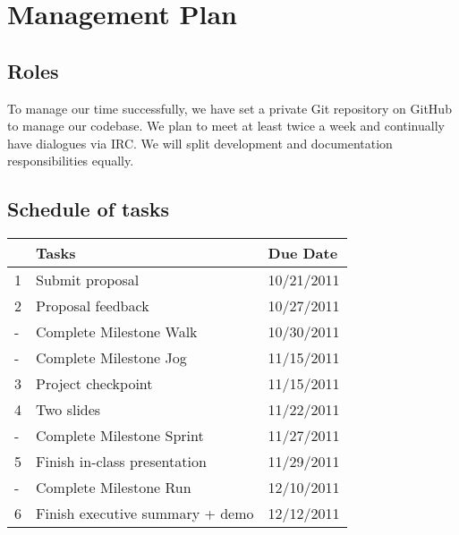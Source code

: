 \documentclass{article}
\begin{document}
\section{Management Plan}
\subsection{Roles}
To manage our time successfully, we have set a private Git repository on GitHub to manage our codebase. 
We plan to meet at least twice a week and continually have dialogues via IRC. We will split development
and documentation responsibilities equally.

\subsection{Schedule of tasks}
\begin{tabular}{|l|l|l|}
\hline
  & Tasks                             & Due Date   \\ \hline
1 & Submit proposal                   & 10/21/2011 \\
2 & Proposal feedback                 & 10/27/2011 \\
- & Complete Milestone Walk           & 10/30/2011 \\
- & Complete Milestone Jog            & 11/15/2011 \\
3 & Project checkpoint                & 11/15/2011 \\
4 & Two slides                        & 11/22/2011 \\
- & Complete Milestone Sprint         & 11/27/2011 \\
5 & Finish in-class presentation      & 11/29/2011 \\
- & Complete Milestone Run            & 12/10/2011 \\
6 & Finish executive summary + demo   & 12/12/2011 \\
\hline
\end{tabular}
\end{document}

